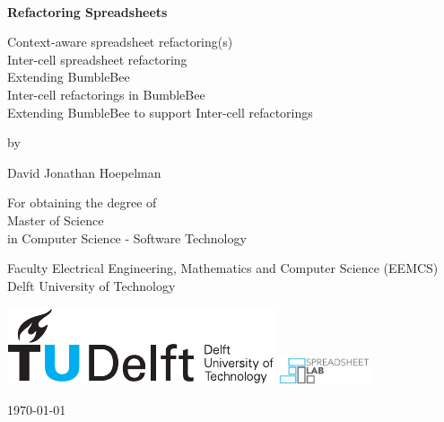 \thispagestyle{empty}
\onecolumn
{%
\sffamily
\centering

~\vspace{\fill}

{\huge \bfseries
Refactoring Spreadsheets
}

\vspace{2.0cm}

Context-aware spreadsheet refactoring(s)\\
Inter-cell spreadsheet refactoring\\
Extending BumbleBee\\
Inter-cell refactorings in BumbleBee\\
Extending BumbleBee to support Inter-cell refactorings\\


\vspace{2.0cm}

by

\vspace{2.0cm}

{\LARGE
David Jonathan Hoepelman
}

\vspace{3.0cm}


\vspace{2.5cm}

For obtaining the degree of \\
Master of Science \\
in Computer Science - Software Technology \\

\vspace{0.5cm}

Faculty Electrical Engineering, Mathematics and Computer Science (EEMCS)\\
Delft University of Technology

\vspace{1.5cm}

\includegraphics{tudelft}
\hspace{0.5cm}
\includegraphics[height=8mm]{spreadsheet-lab}
\hspace{0.5cm}

\vspace{\fill}

\today

}